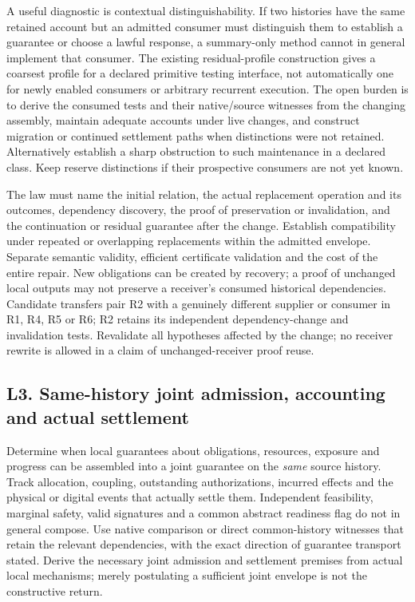 \documentclass[11pt]{article}
\begin{document}
A useful diagnostic is contextual distinguishability. If two histories have the same retained account but an admitted consumer must distinguish them to establish a guarantee or choose a lawful response, a summary-only method cannot in general implement that consumer. The existing residual-profile construction gives a coarsest profile for a declared primitive testing interface, not automatically one for newly enabled consumers or arbitrary recurrent execution. The open burden is to derive the consumed tests and their native/source witnesses from the changing assembly, maintain adequate accounts under live changes, and construct migration or continued settlement paths when distinctions were not retained. Alternatively establish a sharp obstruction to such maintenance in a declared class. Keep reserve distinctions if their prospective consumers are not yet known.

The law must name the initial relation, the actual replacement operation and its outcomes, dependency discovery, the proof of preservation or invalidation, and the continuation or residual guarantee after the change. Establish compatibility under repeated or overlapping replacements within the admitted envelope. Separate semantic validity, efficient certificate validation and the cost of the entire repair. New obligations can be created by recovery; a proof of unchanged local outputs may not preserve a receiver's consumed historical dependencies. Candidate transfers pair R2 with a genuinely different supplier or consumer in R1, R4, R5 or R6; R2 retains its independent dependency-change and invalidation tests. Revalidate all hypotheses affected by the change; no receiver rewrite is allowed in a claim of unchanged-receiver proof reuse.

\subsection*{L3. Same-history joint admission, accounting and actual settlement}
Determine when local guarantees about obligations, resources, exposure and progress can be assembled into a joint guarantee on the \emph{same} source history. Track allocation, coupling, outstanding authorizations, incurred effects and the physical or digital events that actually settle them. Independent feasibility, marginal safety, valid signatures and a common abstract readiness flag do not in general compose. Use native comparison or direct common-history witnesses that retain the relevant dependencies, with the exact direction of guarantee transport stated. Derive the necessary joint admission and settlement premises from actual local mechanisms; merely postulating a sufficient joint envelope is not the constructive return.
\end{document}
